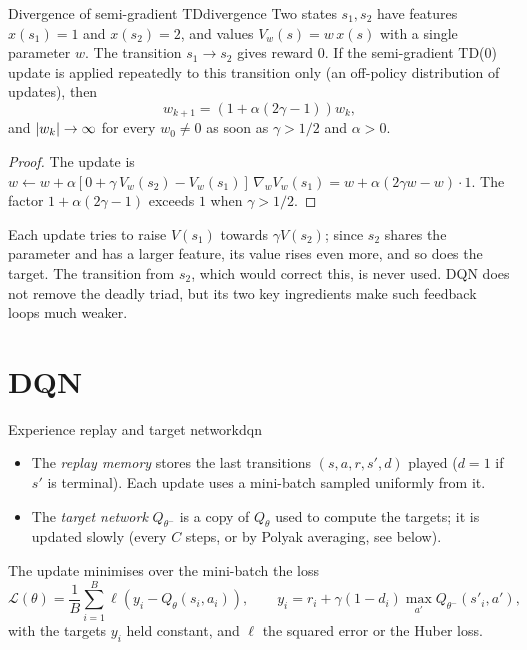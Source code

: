 \begin{proposition}{Divergence of semi-gradient TD}{divergence}
  Two states $s_1, s_2$ have features $x(s_1) = 1$ and $x(s_2) = 2$, and
  values $V_w(s) = w\, x(s)$ with a single parameter $w$. The transition
  $s_1 \to s_2$ gives reward $0$. If the semi-gradient TD(0) update is
  applied repeatedly to this transition only (an off-policy distribution of
  updates), then
  \begin{equation*}
    w_{k+1} = \left(1 + \alpha (2 \gamma - 1)\right) w_k,
  \end{equation*}
  and $\left\lvert w_k \right\rvert \to \infty$ for every $w_0 \neq 0$ as soon as $\gamma >
  1/2$ and $\alpha > 0$.
\end{proposition}

\begin{proof}
  The update is $w \gets w + \alpha [0 + \gamma\, V_w(s_2) - V_w(s_1)]\,
  \nabla_w V_w(s_1) = w + \alpha (2 \gamma w - w) \cdot 1$. The factor $1 +
  \alpha (2 \gamma - 1)$ exceeds $1$ when $\gamma > 1/2$.
\end{proof}

Each update tries to raise $V(s_1)$ towards $\gamma V(s_2)$; since $s_2$
shares the parameter and has a larger feature, its value rises even more,
and so does the target. The transition from $s_2$, which would correct
this, is never used. DQN does not remove the deadly triad, but its two key
ingredients make such feedback loops much weaker.

\section{DQN}

\begin{definition}{Experience replay and target network}{dqn}
  \begin{itemize}[nosep]
    \item The \emph{replay memory} stores the last transitions $(s, a, r,
      s', d)$ played ($d = 1$ if $s'$ is terminal). Each update uses a
      mini-batch sampled uniformly from it.
    \item The \emph{target network} $Q_{\theta^-}$ is a copy of $Q_\theta$
      used to compute the targets; it is updated slowly (every $C$ steps,
      or by Polyak averaging, see below).
  \end{itemize}
  The update minimises over the mini-batch the loss
  \begin{equation}
    \label{eq:dqn-loss}
    \mathcal{L}(\theta) = \frac{1}{B} \sum_{i=1}^{B} \ell\left(y_i -
      Q_\theta(s_i, a_i)\right), \qquad
    y_i = r_i + \gamma (1 - d_i) \max_{a'} Q_{\theta^-}(s'_i, a'),
  \end{equation}
  with the targets $y_i$ held constant, and $\ell$ the squared error or
  the Huber loss.
\end{definition}

